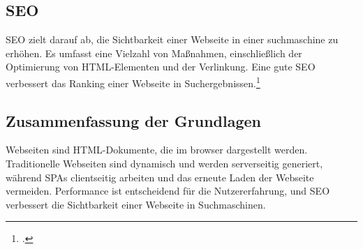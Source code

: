 \subsection{\ac{SEO}}
\ac{SEO} zielt darauf ab, die Sichtbarkeit einer Webseite in einer \gls{suchmaschine} zu erhöhen.
Es umfasst eine Vielzahl von Maßnahmen, einschließlich der Optimierung von \ac{HTML}-Elementen und der Verlinkung.
Eine gute \ac{SEO} verbessert das Ranking einer Webseite in Suchergebnissen.\footcite[Vgl.][Seite 5]{John2016}

\subsection*{Zusammenfassung der Grundlagen}
Webseiten sind \ac{HTML}-Dokumente, die im \gls{browser} dargestellt werden.
Traditionelle Webseiten sind dynamisch und werden serverseitig generiert, während \ac{SPA}s clientseitig arbeiten und das erneute Laden der Webseite vermeiden.
Performance ist entscheidend für die Nutzererfahrung, und \ac{SEO} verbessert die Sichtbarkeit einer Webseite in Suchmaschinen.

